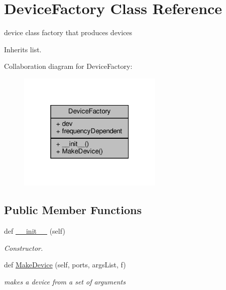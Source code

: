 \hypertarget{classSignalIntegrity_1_1Parsers_1_1Devices_1_1DeviceParser_1_1DeviceFactory}{}\section{Device\+Factory Class Reference}
\label{classSignalIntegrity_1_1Parsers_1_1Devices_1_1DeviceParser_1_1DeviceFactory}


device class factory that produces devices  




Inherits list.



Collaboration diagram for Device\+Factory\+:\nopagebreak
\begin{figure}[H]
\begin{center}
\leavevmode
\includegraphics[width=196pt]{classSignalIntegrity_1_1Parsers_1_1Devices_1_1DeviceParser_1_1DeviceFactory__coll__graph}
\end{center}
\end{figure}
\subsection*{Public Member Functions}
\begin{DoxyCompactItemize}
\item 
def \hyperlink{classSignalIntegrity_1_1Parsers_1_1Devices_1_1DeviceParser_1_1DeviceFactory_ae64f0875afe3067b97ba370b354b9213}{\+\_\+\+\_\+init\+\_\+\+\_\+} (self)
\begin{DoxyCompactList}\small\item\em Constructor. \end{DoxyCompactList}\item 
def \hyperlink{classSignalIntegrity_1_1Parsers_1_1Devices_1_1DeviceParser_1_1DeviceFactory_a84bd6828768b3a1677c71d39f3cb91dd}{Make\+Device} (self, ports, args\+List, f)
\begin{DoxyCompactList}\small\item\em makes a device from a set of arguments \end{DoxyCompactList}\end{DoxyCompactItemize}

